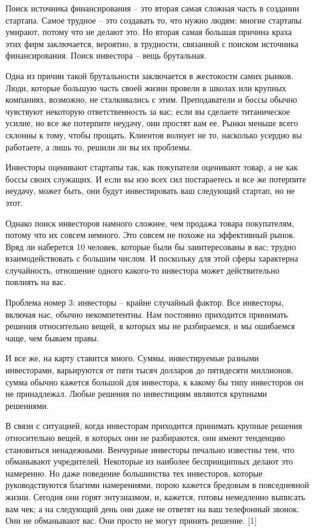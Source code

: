 \documentclass[ebook,12pt,oneside,openany]{memoir}
\begin{document}
\maketitle

Поиск источника финансирования – это вторая самая сложная часть в
создании стартапа. Самое трудное – это создавать то, что нужно людям:
многие стартапы умирают, потому что не делают это. Но вторая самая
большая причина краха этих фирм заключается, вероятно, в трудности,
связанной с поиском источника финансирования. Поиск инвестора – вещь
брутальная.


Одна из причин такой брутальности заключается в жестокости самих
рынков. Люди, которые большую часть своей жизни провели в школах или
крупных компаниях, возможно, не сталкивались с этим. Преподаватели и
боссы обычно чувствуют некоторую ответственность за вас; если вы
сделаете титаническое усилие, но все же потерпите неудачу, они простят
вам ее. Рынки меньше всего склонны к тому, чтобы прощать. Клиентов
волнует не то, насколько усердно вы работаете, а лишь то, решили ли вы
их проблемы.

Инвесторы оценивают стартапы так, как покупатели оценивают товар, а не
как боссы своих служащих. И если вы изо всех сил постараетесь и все же
потерпите неудачу, может быть, они будут инвестировать ваш следующий
стартап, но не этот.

Однако поиск инвесторов намного сложнее, чем продажа товара
покупателям, потому что их совсем немного. Это совсем не похоже на
эффективный рынок. Вряд ли наберется 10 человек, которые были бы
заинтересованы в вас; трудно взаимодействовать с большим числом. И
поскольку для этой сферы характерна случайность, отношение одного
какого-то инвестора может действительно повлиять на вас.

Проблема номер 3: инвесторы – крайне случайный фактор. Все инвесторы,
включая нас, обычно некомпетентны. Нам постоянно приходится принимать
решения относительно вещей, в которых мы не разбираемся, и мы
ошибаемся чаще, чем бываем правы.

И все же, на карту ставится много. Суммы, инвестируемые разными
инвесторами, варьируются от пяти тысяч долларов до пятидесяти
миллионов, сумма обычно кажется большой для инвестора, к какому бы
типу инвесторов он не принадлежал. Любые решения по инвестициям
являются крупными решениями.

В связи с ситуацией, когда инвесторам приходится принимать крупные
решения относительно вещей, в которых они не разбираются, они имеют
тенденцию становиться ненадежными. Венчурные инвесторы печально
известны тем, что обманывают учредителей. Некоторые из наиболее
беспринципных делают это намеренно. Но даже поведение большинства тех
инвесторов, которые руководствуются благими намерениями, порою кажется
бредовым в повседневной жизни. Сегодня они горят энтузиазмом, и,
кажется, готовы немедленно выписать вам чек; а на следующий день они
даже не ответят на ваш телефонный звонок. Они не обманывают вас. Они
просто не могут принять решение. [1]
\end{document}
